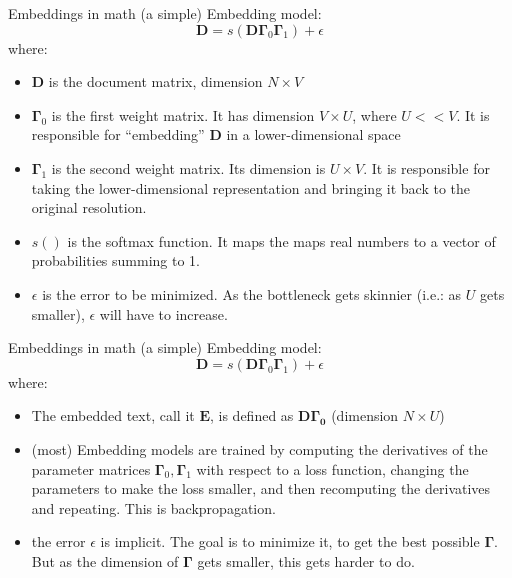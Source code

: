 \documentclass[10pt]{beamer}
\begin{document}
\begin{frame}{Embeddings in math}
(a simple) Embedding model:
\[
\bm{D} = s\left(\bm{D\Gamma}_0\bm{\Gamma}_1\right) + \epsilon
\]
where:
\begin{itemize}
\item $\bm{D}$ is the document matrix, dimension $N\times V$
\item $\bm{\Gamma}_0$ is the first weight matrix.  It has dimension $V \times U$, where $U << V$.  It is responsible for ``embedding'' $\bm{D}$ in a lower-dimensional space
\item $\bm{\Gamma}_1$ is the second weight matrix.  Its dimension is $U \times V$.  It is responsible for taking the lower-dimensional representation and bringing it back to the original resolution.
\item $s()$ is the softmax function.  It maps the maps real numbers to a vector of probabilities summing to 1.
\item $\epsilon$ is the error to be minimized.  As the bottleneck gets skinnier (i.e.: as $U$ gets smaller), $\epsilon$ will have to increase.
\end{itemize}
\end{frame}

\begin{frame}{Embeddings in math}
(a simple) Embedding model:
\[
\bm{D} = s\left(\bm{D\Gamma}_0\bm{\Gamma}_1\right) + \epsilon
\]
where:
\begin{itemize}
\item The embedded text, call it $\bm{E}$, is defined as $\bm{D\Gamma_0}$ (dimension $N \times U$)
\item (most) Embedding models are trained by computing the derivatives of the parameter matrices $\bm{\Gamma}_0, \bm{\Gamma}_1$ with respect to a loss function, changing the parameters to make the loss smaller, and then recomputing the derivatives and repeating.  This is backpropagation.
\item the error $\epsilon$ is implicit.  The goal is to minimize it, to get the best possible $\bm{\Gamma}$.  But as the dimension of $\bm{\Gamma}$ gets smaller, this gets harder to do.
\end{itemize}
\end{frame}
\end{document}
